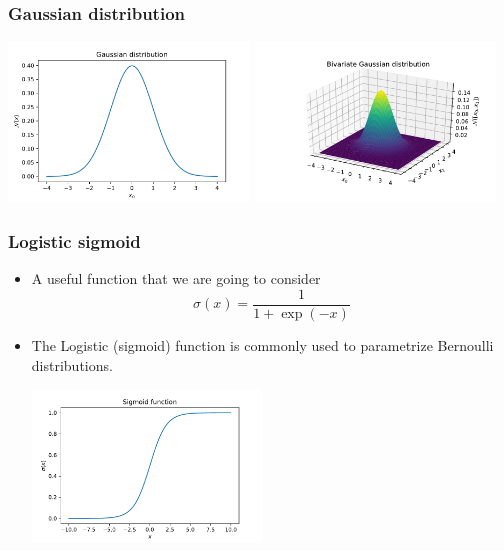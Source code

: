 \documentclass[notes]{beamer}          %
\begin{document}
\begin{frame}
\frametitle{Gaussian distribution}
\begin{center}
\includegraphics[width=0.48\textwidth]{../figures/week_1/gaussian_1d.pdf}
\hfill
\includegraphics[width=0.48\textwidth]{../figures/week_1/gaussian_2d.pdf}
\end{center}
\end{frame}

\begin{frame}
\frametitle{Logistic sigmoid}
\begin{itemize}
    \item A useful function that we are going to consider
    $$\sigma(x) = \frac{1}{1 + \exp{(-x)}}$$
    \item The Logistic (sigmoid) function is commonly used to parametrize Bernoulli distributions.
    \begin{center}
    \includegraphics[width=0.48\textwidth]{../figures/week_1/sigmoid.pdf}
    \end{center}

\end{itemize}
\end{frame}
\end{document}
